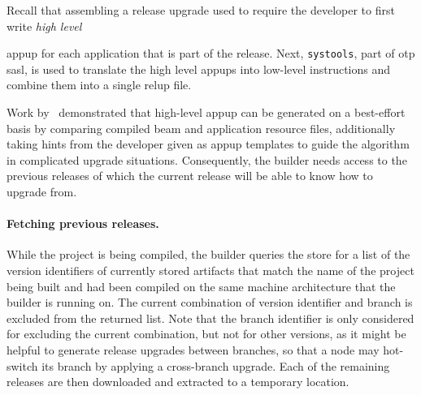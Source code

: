 Recall that assembling a release upgrade used to require the developer to first write \emph{high level} {\acrfull{appup} for each application that is part of the release. Next, \lstinline|systools|, part of \acrshort{otp} \acrfull{sasl}, is used to translate the high level appups into low-level instructions and combine them into a single \acrfull{relup} file.~\cite{doc:otp}

Work by~\cite{rebar3appup} demonstrated that high-level \acrlong{appup} can be generated on a best-effort basis by comparing compiled \acrshort{beam} and application resource files, additionally taking hints from the developer given as appup templates to guide the algorithm in complicated upgrade situations. Consequently, the builder needs access to the previous releases of which the current release will be able to know how to upgrade from.

\paragraph{Fetching previous releases.} While the project is being compiled, the builder queries the store for a list of the version identifiers of currently stored artifacts that match the name of the project being built and had been compiled on the same machine architecture that the builder is running on. The current combination of version identifier and branch is excluded from the returned list. Note that the branch identifier is only considered for excluding the current combination, but not for other versions, as it might be helpful to generate release upgrades between branches, so that a node may hot-switch its branch by applying a cross-branch upgrade. Each of the remaining releases are then downloaded and extracted to a temporary location.

\cleardoublepage
}
